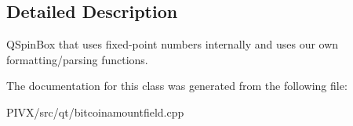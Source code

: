 \subsection{Detailed Description}
Q\+Spin\+Box that uses fixed-\/point numbers internally and uses our own formatting/parsing functions. 

The documentation for this class was generated from the following file\+:\begin{DoxyCompactItemize}
\item 
P\+I\+V\+X/src/qt/bitcoinamountfield.\+cpp\end{DoxyCompactItemize}
